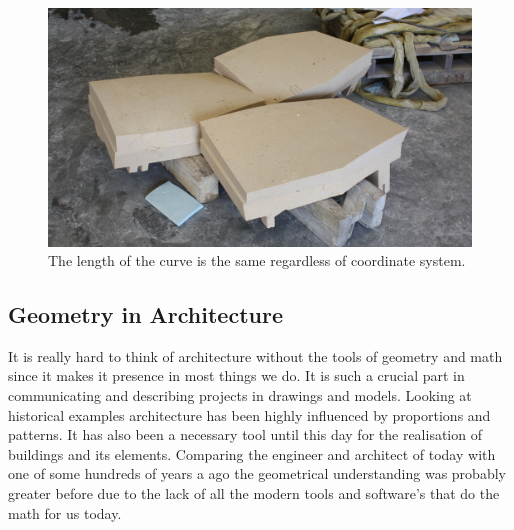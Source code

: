 \begin{figure}[H]
\centering
\includegraphics[height=0.4\linewidth ]{figure/Introduction/blockStereo.jpg}
\caption{The length of the curve is the same regardless of coordinate system.}
\end{figure}


\subsection{Geometry in Architecture}

It is really hard to think of architecture without the tools of geometry and math since it makes it presence in most things we do. It is such a crucial part in communicating and describing projects in drawings and models. Looking at historical examples architecture has been highly influenced
by proportions and patterns. It has also been a necessary tool until this day for the realisation of buildings and its elements. Comparing the engineer and architect of today with one of some hundreds of years a ago the geometrical  understanding was probably greater before due to the lack of  all the modern tools and software's that do the math for us today.  



